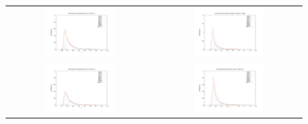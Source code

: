 \begin{figure}[h!]
\begin{tabular}{cc}
\includegraphics[width=0.5\textwidth]{variance_ad_free_mesh_t1_v10.pdf} & \includegraphics[width=0.5\textwidth]{variance_ad_free_mesh_t1_fine_v20.pdf}\\
\includegraphics[width=0.5\textwidth]{variance_ad_free_mesh_t2_v10.pdf} & \includegraphics[width=0.5\textwidth]{variance_ad_free_mesh_t2_v20.pdf}\\

\end{tabular}
\end{figure}
